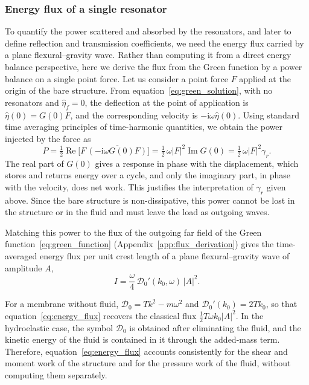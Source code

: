 \subsubsection{Energy flux of a single resonator}
\label{subsubsec:energy_flux_single}

To quantify the power scattered and absorbed by the resonators, and later to define reflection and transmission coefficients, we need the energy flux carried by a plane flexural--gravity wave. Rather than computing it from a direct energy balance perspective, here we derive the flux from the Green function by a power balance on a single point force. Let us consider a point force $F$ applied at the origin of the bare structure. From equation~\eqref{eq:green_solution}, with no resonators and $\widehat{\eta}_f=0$, the deflection at the point of application is $\widehat{\eta}(0)=G(0)F$, and the corresponding velocity is $-\mathrm{i}\omega\widehat{\eta}(0)$. Using standard time averaging principles of time-harmonic quantities, we obtain the power injected by the force as
\begin{equation}
  \label{eq:point_power}
  P=\tfrac12\operatorname{Re}\!\big[F\,\overline{(-\mathrm{i}\omega G(0)F)}\big]=\tfrac12\,\omega|F|^2\operatorname{Im}G(0)=\tfrac12\,\omega|F|^2\gamma_r .
\end{equation}
The real part of $G(0)$ gives a response in phase with the displacement, which stores and returns energy over a cycle, and only the imaginary part, in phase with the velocity, does net work. This justifies the interpretation of $\gamma_r$ given above. Since the bare structure is non-dissipative, this power cannot be lost in the structure or in the fluid and must leave the load as outgoing waves.

Matching this power to the flux of the outgoing far field of the Green function~\eqref{eq:green_function} (Appendix~\ref{app:flux_derivation}) gives the time-averaged energy flux per unit crest length of a plane flexural--gravity wave of amplitude $A$,
\begin{equation}
  \label{eq:energy_flux}
  I=\frac{\omega}{4}\,\mathcal{D}_0'(k_0,\omega)\,|A|^2 .
\end{equation}

\begin{remark}
  For a membrane without fluid, $\mathcal{D}_0=Tk^2-m\omega^2$ and $\mathcal{D}_0'(k_0)=2Tk_0$, so that equation~\eqref{eq:energy_flux} recovers the classical flux $\tfrac12T\omega k_0|A|^2$. In the hydroelastic case, the symbol $\mathcal{D}_0$ is obtained after eliminating the fluid, and the kinetic energy of the fluid is contained in it through the added-mass term. Therefore, equation~\eqref{eq:energy_flux} accounts consistently for the shear and moment work of the structure and for the pressure work of the fluid, without computing them separately.
\end{remark}

